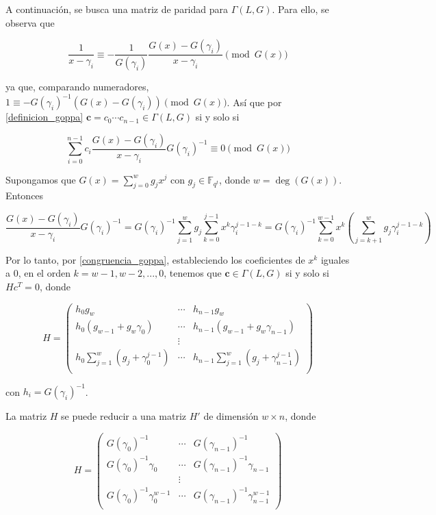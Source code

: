 A continuación, se busca una matriz de paridad para $\Gamma (L,G)$. Para ello, se observa que

$$\frac{1}{x - \gamma_i} \equiv - \frac{1}{G(\gamma_i)} \frac{G(x) - G(\gamma_i)}{x - \gamma_i} \pmod{ G(x)}$$

ya que, comparando numeradores, $1 \equiv - G(\gamma_i)^{-1} \left( G(x) - G(\gamma_i) \right) \pmod{G(x)}$. Así que por \eqref{definicion_goppa} $\textbf{c} = c_0 \cdots c_{n-1} \in \Gamma (L,G)$ si y solo si

\begin{equation}
    \label{congruencia_goppa}
    \sum_{i=0}^{n-1} c_i \frac{G(x) - G(\gamma_i)}{x - \gamma_i} G(\gamma_i)^{-1} \equiv 0 \pmod{G(x)}
\end{equation}

Supongamos que $G(x) = \sum_{j=0}^w g_j x^j$ con $g_j \in \mathbb{F}_{q^t}$, donde $w = \deg{(G(x))}$. Entonces

$$\frac{G(x) - G(\gamma_i)}{x - \gamma_i} G(\gamma_i)^{-1} = G(\gamma_i)^{-1} \sum_{j=1}^w g_j \sum_{k=0}^{j-1} x^k \gamma_i^{j-1-k} = G(\gamma_i)^{-1} \sum_{k=0}^{w-1} x^k \left( \sum_{j=k+1}^w g_j \gamma_i^{j-1-k} \right)$$

Por lo tanto, por \eqref{congruencia_goppa}, estableciendo los coeficientes de $x^k$ iguales a $0$, en el orden $k = w - 1, w - 2, ..., 0$, tenemos que $\textbf{c} \in \Gamma (L,G)$ si y solo si $Hc^T = 0$, donde 

\begin{equation}
    H = \left(
        \begin{array}{ccc} 
            h_0 g_w & \cdots & h_{n-1} g_w  \\
            h_0 (g_{w-1} + g_w \gamma_0) & \cdots & h_{n-1} (g_{w-1} + g_w \gamma_{n-1}) \\
            & \vdots & \\
            h_0 \sum_{j=1}^w \left( g_j + \gamma_0^{j-1} \right) & \cdots & h_{n-1} \sum_{j=1}^w \left( g_{j} + \gamma_{n-1}^{j-1} \right) \\
        \end{array}
        \right)
\end{equation}

con $h_i = G(\gamma_i)^{-1}$.

\begin{proposition}
    La matriz $H$ se puede reducir a una matriz $H'$ de dimensión $w \times n$, donde 

    \begin{equation}
        H = \left(
            \begin{array}{ccc} 
                G(\gamma_0)^{-1} & \cdots & G(\gamma_{n-1})^{-1}  \\
                G(\gamma_0)^{-1} \gamma_0 & \cdots & G(\gamma_{n-1})^{-1} \gamma_{n-1} \\
                & \vdots & \\
                G(\gamma_0)^{-1} \gamma_0^{w-1} & \cdots & G(\gamma_{n-1})^{-1} \gamma_{n-1}^{w-1} \\
            \end{array}
            \right)
    \end{equation}
\end{proposition}

